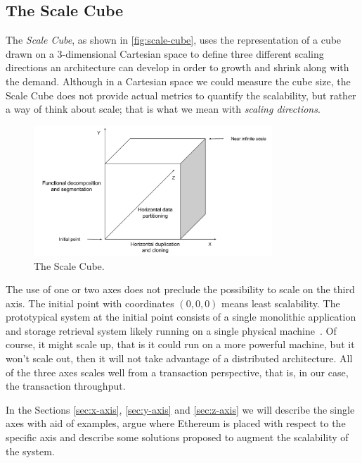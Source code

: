 \subsection{The Scale Cube}
\label{sec:scale-cube}

The \emph{Scale Cube}, as shown in \autoref{fig:scale-cube}, uses the
representation of a cube drawn on a 3-dimensional Cartesian space to define
three different scaling directions an architecture can develop in order to
growth and shrink along with the demand. Although in a Cartesian space we could
measure the cube size, the Scale Cube does not provide actual metrics to
quantify the scalability, but rather a way of think about scale; that is what
we mean with \emph{scaling directions}.

\begin{figure}[h]
	\begin{center}
		\includegraphics[width=0.8\textwidth]{./res/img/scale-cube.pdf}
	\end{center}
	\caption{The Scale Cube.}
	\label{fig:scale-cube}
\end{figure}

The use of one or two axes does not preclude the possibility to scale on the
third axis. The initial point with coordinates $(0,0,0)$ means least
scalability. The prototypical system at the initial point consists of a single
monolithic application and storage retrieval system likely running on a single
physical machine~\cite{bib:art-of-scalability}. Of course, it might scale up,
that is it could run on a more powerful machine, but it won't scale out, then it
will not take advantage of a distributed architecture. All of the three axes
scales well from a transaction perspective, that is, in our case, the
transaction throughput. 

In the Sections \ref{sec:x-axis}, \ref{sec:y-axis} and \ref{sec:z-axis} we will
describe the single axes with aid of examples, argue where Ethereum is placed 
with respect to the specific axis and describe some solutions proposed to 
augment the scalability of the system.
